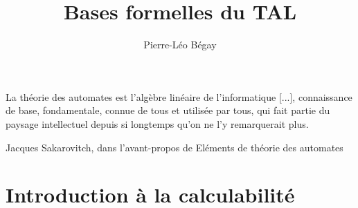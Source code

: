 \documentclass{report}
\title{Bases formelles du TAL}
\author{Pierre-Léo Bégay}
\theoremstyle{slanted}
\begin{document}
\maketitle

\epigraph{La théorie des automates est l'algèbre linéaire de l'informatique [...], connaissance de base, fondamentale, connue de tous et utilisée par tous, qui fait partie du paysage intellectuel depuis si longtemps qu'on ne l'y remarquerait plus.}{Jacques Sakarovitch, dans l'avant-propos de Eléments de théorie des automates}

\tableofcontents









%
\chapter{Introduction à la calculabilité}






\appendix


\end{document}
